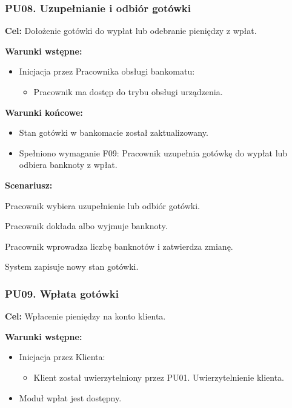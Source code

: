 \documentclass[10pt,a4paper]{article}
\begin{document}
\subsubsection*{PU08. Uzupełnianie i odbiór gotówki}

\noindent\textbf{Cel:} Dołożenie gotówki do wypłat lub odebranie pieniędzy z wpłat.

\noindent\textbf{Warunki wstępne:}
\begin{itemize}
    \item Inicjacja przez Pracownika obsługi bankomatu:
    \begin{itemize}
        \item Pracownik ma dostęp do trybu obsługi urządzenia.
    \end{itemize}
\end{itemize}

\noindent\textbf{Warunki końcowe:}
\begin{itemize}
    \item Stan gotówki w bankomacie został zaktualizowany.
    \item Spełniono wymaganie F09: Pracownik uzupełnia gotówkę do wypłat lub odbiera banknoty z wpłat.
\end{itemize}

\noindent\textbf{Scenariusz:}
\begin{scenariusz}
    \item Pracownik wybiera uzupełnienie lub odbiór gotówki.
    \item Pracownik dokłada albo wyjmuje banknoty.
    \item Pracownik wprowadza liczbę banknotów i zatwierdza zmianę.
    \item System zapisuje nowy stan gotówki.
\end{scenariusz}


\subsubsection*{PU09. Wpłata gotówki}

\noindent\textbf{Cel:} Wpłacenie pieniędzy na konto klienta.

\noindent\textbf{Warunki wstępne:}
\begin{itemize}
    \item Inicjacja przez Klienta:
    \begin{itemize}
        \item Klient został uwierzytelniony przez PU01. Uwierzytelnienie klienta.
    \end{itemize}
    \item Moduł wpłat jest dostępny.
\end{itemize}
\end{document}
